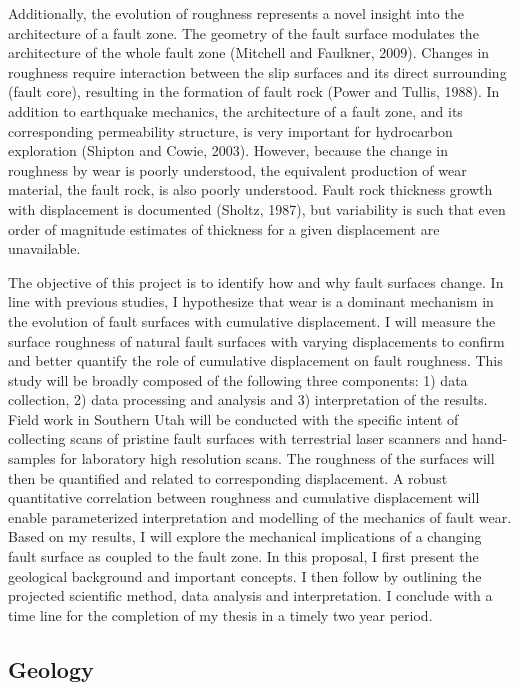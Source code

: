 \documentclass[12pt,a4paper]{article}
\begin{document}
Additionally, the evolution of roughness represents a novel insight into the architecture of a fault zone.  The geometry of the fault surface modulates the architecture of the whole fault zone (Mitchell and Faulkner, 2009). Changes in roughness require interaction between the slip surfaces and its direct surrounding (fault core), resulting in the formation of fault rock (Power and Tullis, 1988). In addition to earthquake mechanics, the architecture of a fault zone, and its corresponding permeability structure, is very important for hydrocarbon exploration (Shipton and Cowie, 2003). However, because the change in roughness by wear is poorly understood, the equivalent production of wear material, the fault rock, is also poorly understood. Fault rock thickness growth with displacement is documented (Sholtz, 1987), but variability is such that even order of magnitude estimates of thickness for a given displacement are unavailable.

	The objective of this project is to identify how and why fault surfaces change. In line with previous studies, I hypothesize that wear is a dominant mechanism in the evolution of fault surfaces with cumulative displacement. I will measure the surface roughness of natural fault surfaces with varying displacements to confirm and better quantify the role of cumulative displacement on fault roughness. This study will be broadly composed of the following three components: 1) data collection, 2) data processing and analysis and 3) interpretation of the results. Field work in Southern Utah will be conducted with the specific intent of collecting scans of pristine fault  surfaces with terrestrial laser scanners and hand-samples for laboratory high resolution scans. The roughness of the surfaces will then be quantified and related to corresponding displacement. A robust quantitative correlation between roughness and cumulative displacement will enable parameterized interpretation and modelling of the mechanics of fault wear. Based on my results, I will explore the mechanical implications of a changing fault surface as coupled to the fault zone. In this proposal, I first present the geological background and important concepts. I then follow by outlining the projected scientific method, data analysis and interpretation. I conclude with a time line for the completion of my thesis in a timely two year period. 

\subsection{Geology}
\end{document}
